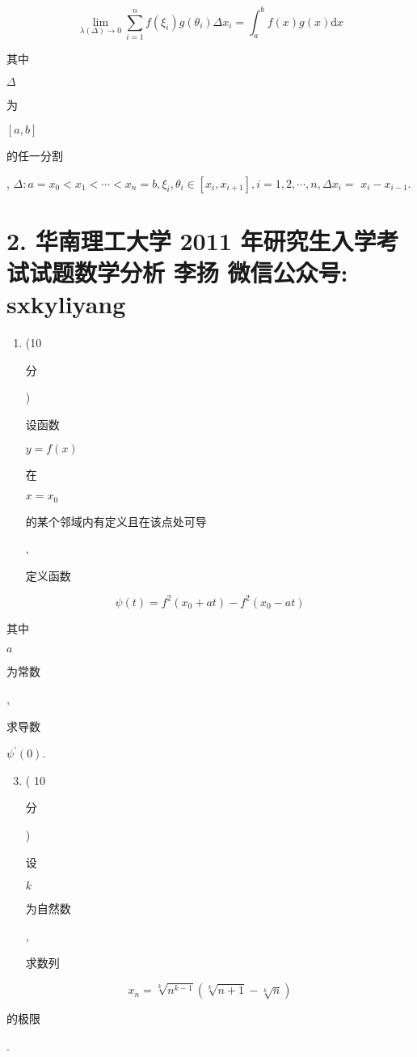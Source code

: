 \documentclass[10pt]{article}
\begin{document}
$$
\lim _{\lambda(\Delta) \rightarrow 0} \sum_{i=1}^{n} f\left(\xi_{i}\right) g\left(\theta_{i}\right) \Delta x_{i}=\int_{a}^{b} f(x) g(x) \mathrm{d} x
$$
\begin{CJK}{UTF8}{mj}其中\end{CJK} $\Delta$ \begin{CJK}{UTF8}{mj}为\end{CJK} $[a, b]$ \begin{CJK}{UTF8}{mj}的任一分割\end{CJK}, $\Delta: a=x_{0}<x_{1}<\cdots<x_{n}=b, \xi_{i}, \theta_{i} \in\left[x_{i}, x_{i+1}\right], i=1,2, \cdots, n, \Delta x_{i}=$ $x_{i}-x_{i-1}$.

\section{2. 华南理工大学 2011 年研究生入学考试试题数学分析 
 李扬 
 微信公众号: sxkyliyang}
\begin{enumerate}
  \item (10 \begin{CJK}{UTF8}{mj}分\end{CJK}) \begin{CJK}{UTF8}{mj}设函数\end{CJK} $y=f(x)$ \begin{CJK}{UTF8}{mj}在\end{CJK} $x=x_{0}$ \begin{CJK}{UTF8}{mj}的某个邻域内有定义且在该点处可导\end{CJK}, \begin{CJK}{UTF8}{mj}定义函数\end{CJK}
\end{enumerate}
$$
\psi(t)=f^{2}\left(x_{0}+a t\right)-f^{2}\left(x_{0}-a t\right)
$$
\begin{CJK}{UTF8}{mj}其中\end{CJK} $a$ \begin{CJK}{UTF8}{mj}为常数\end{CJK}, \begin{CJK}{UTF8}{mj}求导数\end{CJK} $\psi^{\prime}(0)$.

\begin{enumerate}
  \setcounter{enumi}{2}
  \item ( 10 \begin{CJK}{UTF8}{mj}分\end{CJK}) \begin{CJK}{UTF8}{mj}设\end{CJK} $k$ \begin{CJK}{UTF8}{mj}为自然数\end{CJK}, \begin{CJK}{UTF8}{mj}求数列\end{CJK}
\end{enumerate}
$$
x_{n}=\sqrt[k]{n^{k-1}}(\sqrt[k]{n+1}-\sqrt[k]{n})
$$
\begin{CJK}{UTF8}{mj}的极限\end{CJK}.
\end{document}
